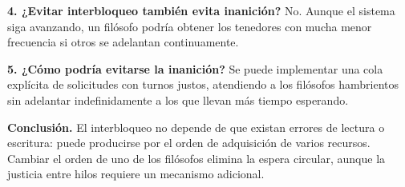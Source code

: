 \documentclass[12pt]{report}
\begin{document}
\textbf{4. ¿Evitar interbloqueo también evita inanición?} No. Aunque el sistema siga avanzando, un filósofo podría obtener los tenedores con mucha menor frecuencia si otros se adelantan continuamente.

\textbf{5. ¿Cómo podría evitarse la inanición?} Se puede implementar una cola explícita de solicitudes con turnos justos, atendiendo a los filósofos hambrientos sin adelantar indefinidamente a los que llevan más tiempo esperando.

\textbf{Conclusión.} El interbloqueo no depende de que existan errores de lectura o escritura: puede producirse por el orden de adquisición de varios recursos. Cambiar el orden de uno de los filósofos elimina la espera circular, aunque la justicia entre hilos requiere un mecanismo adicional.
\end{document}
